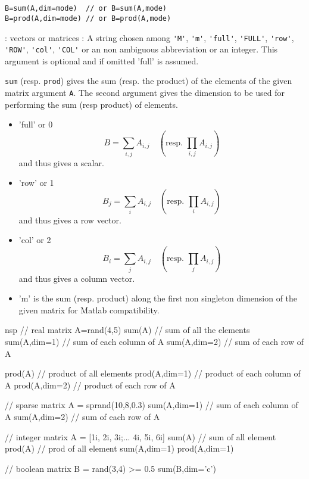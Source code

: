 \begin{mandesc}
  \\ %
  \\ %
\end{mandesc}
\begin{calling_sequence}
\begin{verbatim}
B=sum(A,dim=mode)  // or B=sum(A,mode)  
B=prod(A,dim=mode) // or B=prod(A,mode)  
\end{verbatim}
\end{calling_sequence}
\begin{parameters}
  \begin{varlist}
    : vectors or matrices
    : A string chosen among \verb+'M'+, \verb+'m'+, \verb+'full'+, \verb+'FULL'+, \verb+'row'+,
    \verb+'ROW'+, \verb+'col'+, \verb+'COL'+ or an non ambiguous abbreviation or an integer. 
    This argument is optional and if omitted 'full' is assumed.
  \end{varlist}
\end{parameters}
\begin{mandescription}
  \verb+sum+ (resp. \verb+prod+) gives the sum (resp. the product) of the elements of the given matrix
  argument \verb+A+. 
  The second argument gives the dimension to be used for performing the sum (resp product) of elements.
  \begin{itemize}
    \item 'full' or 0  $$B= \sum_{i,j} A_{i,j} \quad \left(\text{resp. } \prod_{i,j} A_{i,j} \right)$$ and thus gives a scalar.
    \item 'row' or 1  $$B_j = \sum_{i} A_{i,j}\quad \left(\text{resp. } \prod_{i} A_{i,j} \right)$$ and thus gives a row vector.
    \item 'col' or 2  $$B_i = \sum_{j} A_{i,j}\quad \left(\text{resp. } \prod_{j} A_{i,j}\right)$$ and thus gives a column vector.
    \item 'm' is the sum (resp. product) along the first non singleton dimension of the given matrix 
      for Matlab compatibility. 
  \end{itemize}
\end{mandescription}
\begin{examples}
\begin{mintednsp}{nsp}
// real matrix 
A=rand(4,5)
sum(A)  // sum of all the elements 
sum(A,dim=1)  // sum of each column of A
sum(A,dim=2)  // sum of each row of A

prod(A)  // product of all elements
prod(A,dim=1)  // product of each column of A
prod(A,dim=2)  // product of each row of A

// sparse matrix 
A = sprand(10,8,0.3)
sum(A,dim=1)  // sum of each column of A
sum(A,dim=2)  // sum of each row of A

// integer matrix
A = [1i, 2i, 3i;...
     4i, 5i, 6i]
sum(A)        // sum of all element
prod(A)       // prod of all element
sum(A,dim=1)
prod(A,dim=1)

// boolean matrix 
B = rand(3,4) >= 0.5
sum(B,dim='c')
\end{mintednsp}
\end{examples}
\begin{manseealso}
     
\end{manseealso}

